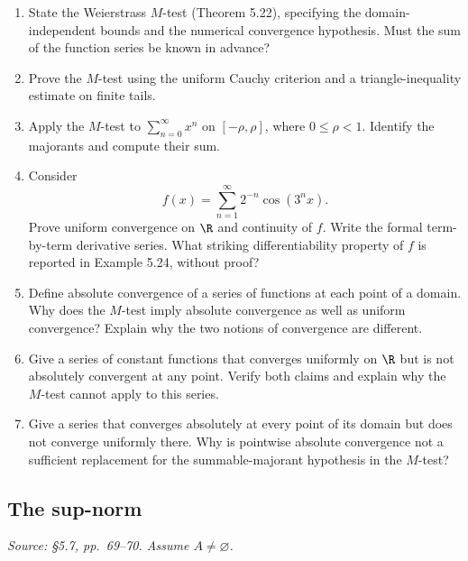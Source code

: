 \begin{enumerate}[resume]
  \item State the Weierstrass \(M\)-test (Theorem 5.22), specifying
    the domain-independent bounds and the numerical convergence
    hypothesis. Must the sum of the function series be known in advance?

  \item Prove the \(M\)-test using the uniform Cauchy criterion
    and a triangle-inequality estimate on finite tails.

  \item Apply the \(M\)-test to \(\sum_{n=0}^{\infty}x^n\) on
    \([-\rho,\rho]\), where \(0\leq\rho<1\).
    Identify the majorants and compute their sum.

  \item Consider
    \[
      f(x)=\sum_{n=1}^{\infty}2^{-n}\cos(3^n x).
    \]
    Prove uniform convergence on \(\R\) and continuity of \(f\).
    Write the formal term-by-term derivative series.
    What striking differentiability property of \(f\) is reported
    in Example 5.24, without proof?

  \item Define absolute convergence of a series of functions at each
    point of a domain. Why does the \(M\)-test imply absolute
    convergence as well as uniform convergence?
    Explain why the two notions of convergence are different.

  \item Give a series of constant functions that converges uniformly
    on \(\R\) but is not absolutely convergent at any point.
    Verify both claims and explain why the \(M\)-test cannot apply
    to this series.

  \item Give a series that converges absolutely at every point of
    its domain but does not converge uniformly there.
    Why is pointwise absolute convergence not a sufficient replacement
    for the summable-majorant hypothesis in the \(M\)-test?
\end{enumerate}

\subsection{The sup-norm}
\textit{Source: \S5.7, pp.~69--70. Assume \(A\ne\varnothing\).}

